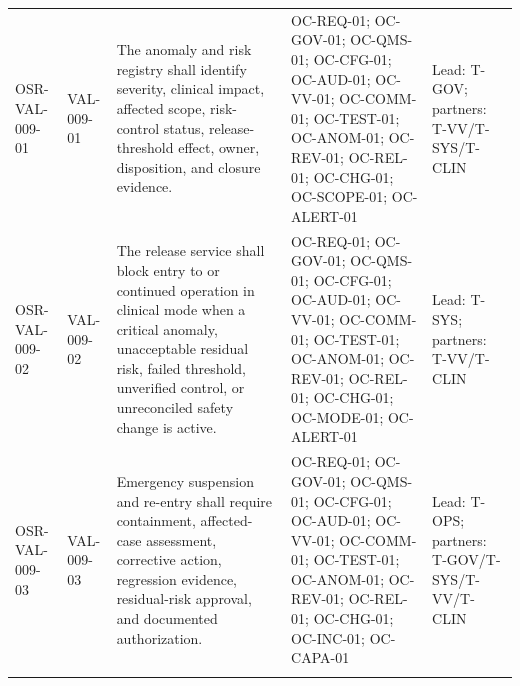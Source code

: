 \documentclass[11pt,letterpaper]{article}
\begin{document}
\begin{scriptsize}
\begin{longtable}{@{}L{0.16\textwidth}L{0.10\textwidth}L{0.31\textwidth}L{0.23\textwidth}L{0.125\textwidth}@{}}
\mbox{OSR-VAL-009-01} & \mbox{VAL-009-01} & The anomaly and risk registry shall identify severity, clinical impact, affected scope, risk-control status, release-threshold effect, owner, disposition, and closure evidence. & OC-REQ-01; OC-GOV-01; OC-QMS-01; OC-CFG-01; OC-AUD-01; OC-VV-01; OC-COMM-01; OC-TEST-01; OC-ANOM-01; OC-REV-01; OC-REL-01; OC-CHG-01; OC-SCOPE-01; OC-ALERT-01 & Lead: T-GOV; partners: T-VV\slash\allowbreak{}T-SYS\slash\allowbreak{}T-CLIN \\
\addlinespace[2pt]
\mbox{OSR-VAL-009-02} & \mbox{VAL-009-02} & The release service shall block entry to or continued operation in clinical mode when a critical anomaly, unacceptable residual risk, failed threshold, unverified control, or unreconciled safety change is active. & OC-REQ-01; OC-GOV-01; OC-QMS-01; OC-CFG-01; OC-AUD-01; OC-VV-01; OC-COMM-01; OC-TEST-01; OC-ANOM-01; OC-REV-01; OC-REL-01; OC-CHG-01; OC-MODE-01; OC-ALERT-01 & Lead: T-SYS; partners: T-VV\slash\allowbreak{}T-CLIN \\
\addlinespace[2pt]
\mbox{OSR-VAL-009-03} & \mbox{VAL-009-03} & Emergency suspension and re-entry shall require containment, affected-case assessment, corrective action, regression evidence, residual-risk approval, and documented authorization. & OC-REQ-01; OC-GOV-01; OC-QMS-01; OC-CFG-01; OC-AUD-01; OC-VV-01; OC-COMM-01; OC-TEST-01; OC-ANOM-01; OC-REV-01; OC-REL-01; OC-CHG-01; OC-INC-01; OC-CAPA-01 & Lead: T-OPS; partners: T-GOV\slash\allowbreak{}T-SYS\slash\allowbreak{}T-VV\slash\allowbreak{}T-CLIN \\
\addlinespace[2pt]
\end{longtable}
\end{scriptsize}
\end{document}
